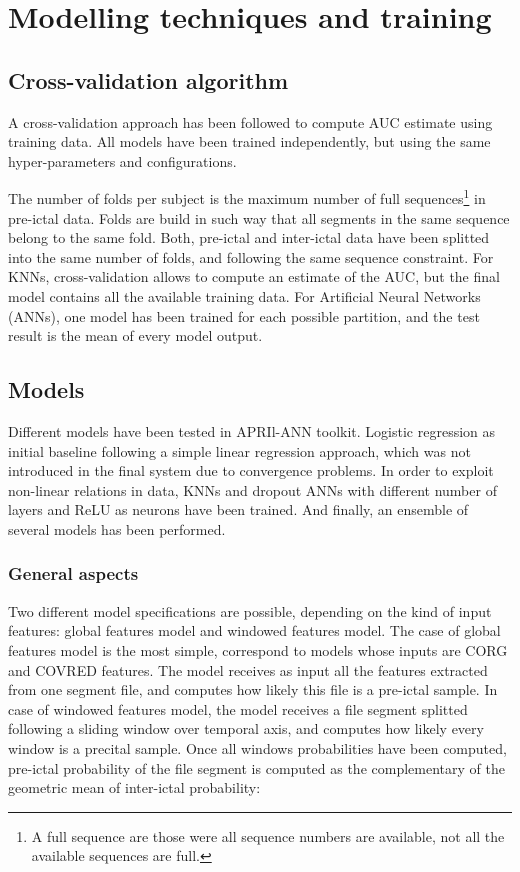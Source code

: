\documentclass[a4paper,english,twoside]{article}
\begin{document}
\section{Modelling techniques and
  training}\label{modelling-techniques-and-training}

\subsection{Cross-validation
  algorithm}\label{cross-validation-algorithm}

A cross-validation approach has been followed to compute AUC estimate using
training data. All models have been trained independently, but using the same
hyper-parameters and configurations.

The number of folds per subject is the maximum number of full
sequences\footnote{A full sequence are those were all sequence numbers are
  available, not all the available sequences are full.} in pre-ictal data. Folds
are build in such way that all segments in the same sequence belong to the same
fold. Both, pre-ictal and inter-ictal data have been splitted into the same
number of folds, and following the same sequence constraint.  For KNNs,
cross-validation allows to compute an estimate of the AUC, but the final model
contains all the available training data.  For Artificial Neural Networks
(ANNs), one model has been trained for each possible partition, and the test
result is the mean of every model output.

\subsection{Models}\label{models}

Different models have been tested in APRIl-ANN toolkit. Logistic regression as
initial baseline following a simple linear regression approach, which was not
introduced in the final system due to convergence problems.  In order to exploit
non-linear relations in data, KNNs and dropout ANNs with different number of
layers and ReLU as neurons have been trained. And finally, an ensemble of
several models has been performed.

\subsubsection{General aspects}

Two different model specifications are possible, depending on the kind of input
features: global features model and windowed features model. The case of global
features model is the most simple, correspond to models whose inputs are CORG and
COVRED features. The model receives as input all the features extracted from
one segment file, and computes how likely this file is a pre-ictal sample. In
case of windowed features model, the model receives a file segment splitted
following a sliding window over temporal axis, and computes how likely every
window is a precital sample. Once all windows probabilities have been computed,
pre-ictal probability of the file segment is computed as the complementary of the
geometric mean of inter-ictal probability:
\end{document}
